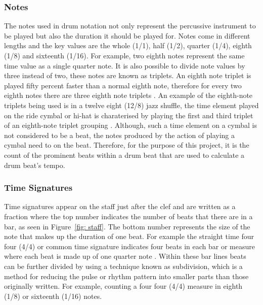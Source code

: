 \documentclass[a4paper, 11pt]{article}
\begin{document}
\subsubsection{Notes}
The notes used in drum notation not only represent the percussive instrument to be played but also the duration it should be played for. Notes come in different lengths and the key values are the whole (1/1), half (1/2), quarter (1/4), eighth (1/8) and sixteenth (1/16). For example, two eighth notes represent the same time value as a single quarter note. It is also possible to divide note values by three instead of two, these notes are known as triplets. An eighth note triplet is played fifty percent faster than a normal eighth note, therefore for every two eighth notes there are three eighth note triplets \cite{drum-note}. An example of the eighth-note triplets being used is in a twelve eight (12/8) jazz shuffle, the time element played on the ride cymbal or hi-hat is charaterised by playing the first and third triplet of an eighth-note triplet grouping \cite{drum-bible}. Although, such a time element on a cymbal is not considered to be a beat, the notes produced by the action of playing a cymbal need to on the beat. Therefore, for the purpose of this project, it is the count of the prominent beats within a drum beat that are used to calculate a drum beat's tempo.


\subsubsection{Time Signatures}\label{sec: ts}
Time signatures appear on the staff just after the clef and are written as a fraction where the top number indicates the number of beats that there are in a bar, as seen in Figure~\ref{fig: staff}. The bottom number represents the size of the note that makes up the duration of one beat. For example the straight time four four (4/4) or common time signature indicates four beats in each bar or measure where each beat is made up of one quarter note \cite{drum-note}. Within these bar lines beats can be further divided by using a technique known as subdivision, which is a method for reducing the pulse or rhythm pattern into smaller parts than those originally written. For example, counting a four four (4/4) measure in eighth (1/8) or sixteenth (1/16) notes. 
\end{document}
